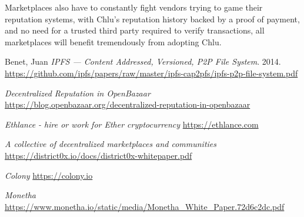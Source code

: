\documentclass[a4paper]{article}
\begin{document}
Marketplaces also have to constantly fight vendors trying to game
their reputation systems, with Chlu's reputation history backed by a
proof of payment, and no need for a trusted third party required to
verify transactions, all marketplaces will benefit tremendously from
adopting Chlu.

\medskip
 
\begin{thebibliography}{9}

  Benet, Juan
  \textit{IPFS --- Content Addressed, Versioned, P2P File System}. 2014.
  \url{https://github.com/ipfs/papers/raw/master/ipfs-cap2pfs/ipfs-p2p-file-system.pdf}

  \textit{Decentralized Reputation in OpenBazaar}
  \newline
  \url{https://blog.openbazaar.org/decentralized-reputation-in-openbazaar}

  \textit{Ethlance - hire or work for Ether cryptocurrency}
  \url{https://ethlance.com}

  \textit{A collective of decentralized marketplaces and communities}
  \url{https://district0x.io/docs/district0x-whitepaper.pdf}

  \textit{Colony}
  \url{https://colony.io}

  \textit{Monetha}
  \url{https://www.monetha.io/static/media/Monetha_White_Paper.72d6c2dc.pdf}
  
\end{thebibliography}
\end{document}
